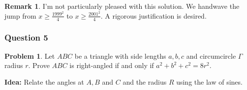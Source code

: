 \documentclass[11pt]{article}
\theoremstyle{definition}
\newtheorem*{problem}{Problem}
\newtheorem*{remark}{Remark}
\begin{document}
\begin{remark}
  I'm not particularly pleased with this solution. We handwave the jump from $x \geq \frac{1999^2}{4}$ to $x \geq 
  \frac{2001^2}{4}$. A rigorous justification is desired. 
\end{remark}

\newpage

\subsubsection{Question 5}

\begin{problem}
  Let $ABC$ be a triangle with side lengths $a, b, c$ and circumcircle $\Gamma$ radius $r$. Prove $ABC$ is 
  right-angled if and only if $a^2 + b^2 + c^2 = 8r^2$. 
\end{problem}

{\bf Idea: } Relate the angles at $A, B$ and $C$ and the radius $R$ using the law of sines. 
\end{document}
